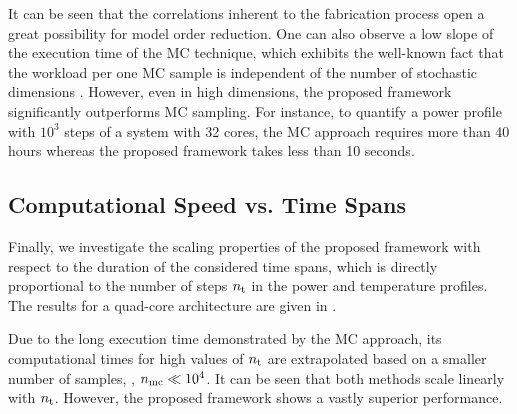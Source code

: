 It can be seen that the correlations inherent to the fabrication process \cite{cheng2011} open a great possibility for model order reduction.
One can also observe a low slope of the execution time of the MC technique, which exhibits the well-known fact that the workload per one MC sample is independent of the number of stochastic dimensions \cite{maitre2010}.
However, even in high dimensions, the proposed framework significantly outperforms MC sampling. For instance, to quantify a power profile with $10^3$ steps of a system with 32 cores, the MC approach requires more than 40 hours whereas the proposed framework takes less than 10 seconds.

\subsection{Computational Speed vs. Time Spans}
Finally, we investigate the scaling properties of the proposed framework with respect to the duration of the considered time spans, which is directly proportional to the number of steps ${n_\text{t}}$ in the power and temperature profiles.
The results for a quad-core architecture are given in .


Due to the long execution time demonstrated by the MC approach, its computational times for high values of ${n_\text{t}}$ are extrapolated based on a smaller number of samples, \ie, ${n_\text{mc}} \ll 10^4$.
It can be seen that both methods scale linearly with ${n_\text{t}}$. However, the proposed framework shows a vastly superior performance.

